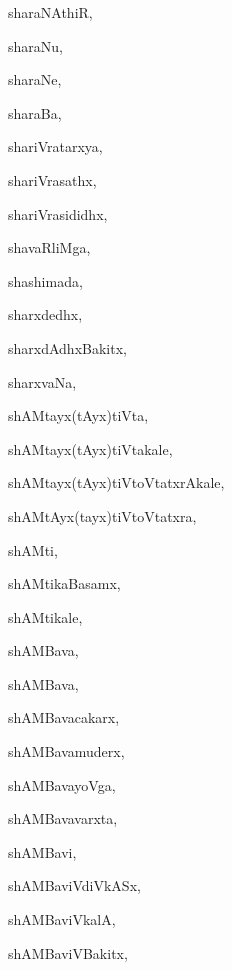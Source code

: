 \begin{multicols}{3}
{\noindent
{sharaNAthiR}, \pageref{sharaNAthiR}

\noindent
{sharaNu}, \pageref{sharaNu}

\noindent
{sharaNe}, \pageref{sharaNe}

\noindent
{sharaBa}, \pageref{sharaBa}

\noindent
{shariVratarxya}, \pageref{shariVratarxya}

\noindent
{shariVrasathx}, \pageref{shariVrasathx}

\noindent
{shariVrasididhx}, \pageref{shariVrasididhx}

\noindent
{shavaRliMga}, \pageref{shavaRliMga}

\noindent
{shashimada}, \pageref{shashimada}

\noindent
{sharxdedhx}, \pageref{sharxdedhx}

\noindent
{sharxdAdhxBakitx}, \pageref{sharxdAdhxBakitx}

\noindent
{sharxvaNa}, \pageref{sharxvaNa}

\noindent
{shAMtayx(tAyx)tiVta}, \pageref{shAMtayxtAyxtiVta}

\noindent
{shAMtayx(tAyx)tiVtakale}, \pageref{shAMtayxtAyxtiVtakale}

\noindent
{shAMtayx(tAyx)tiVtoVtatxrAkale}, \pageref{shAMtayxtAyxtiVtoVtatxrAkale}

\noindent
{shAMtAyx(tayx)tiVtoVtatxra}, \pageref{shAMtAyxtayxtiVtoVtatxra}

\noindent
{shAMti}, \pageref{shAMti}

\noindent
{shAMtikaBasamx}, \pageref{shAMtikaBasamx}

\noindent
{shAMtikale}, \pageref{shAMtikale}

\noindent
{shAMBava}, \pageref{shAMBava1}

\noindent
{shAMBava}, \pageref{shAMBava2}

\noindent
{shAMBavacakarx}, \pageref{shAMBavacakarx}

\noindent
{shAMBavamuderx}, \pageref{shAMBavamuderx}

\noindent
{shAMBavayoVga}, \pageref{shAMBavayoVga}

\noindent
{shAMBavavarxta}, \pageref{shAMBavavarxta}

\noindent
{shAMBavi}, \pageref{shAMBavi}

\noindent
{shAMBaviVdiVkASx}, \pageref{shAMBaviVdiVkASx}

\noindent
{shAMBaviVkalA}, \pageref{shAMBaviVkalA}

\noindent
{shAMBaviVBakitx}, \pageref{shAMBaviVBakitx}

}
\end{multicols}
